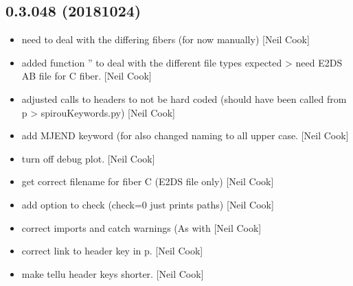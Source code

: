 \documentclass[a4paper,10pt,english]{report}
\begin{document}
\subsection{0.3.048 (2018\sphinxhyphen{}10\sphinxhyphen{}24)}
\label{\detokenize{misc/changelog:id302}}\begin{itemize}
\item {} 
 \sphinxhyphen{} need to deal with the differing fibers (for now
manually) {[}Neil Cook{]}

\item {} 
 \sphinxhyphen{} added function ” to deal with the
different file types expected \textendash{}\textgreater{} need E2DS AB file for C fiber. {[}Neil
Cook{]}

\item {} 
 \sphinxhyphen{} adjusted calls to headers to not be hard coded
(should have been called from p \textendash{}\textgreater{} spirouKeywords.py) {[}Neil Cook{]}

\item {} 
 \sphinxhyphen{} add MJEND keyword (for  \sphinxhyphen{} also
changed naming to all upper case. {[}Neil Cook{]}

\item {} 
 \sphinxhyphen{} turn off debug plot. {[}Neil Cook{]}

\item {} 
 \sphinxhyphen{} get correct filename for fiber C (E2DS
file only) {[}Neil Cook{]}

\item {} 
 \sphinxhyphen{} add option to check (check=0 just prints
paths) {[}Neil Cook{]}

\item {} 
 \sphinxhyphen{} correct imports and catch warnings (As
with  {[}Neil Cook{]}

\item {} 
 \sphinxhyphen{} correct link to header key in p. {[}Neil
Cook{]}

\item {} 
 \sphinxhyphen{} make tellu header keys shorter. {[}Neil Cook{]}


\end{itemize}
\end{document}
